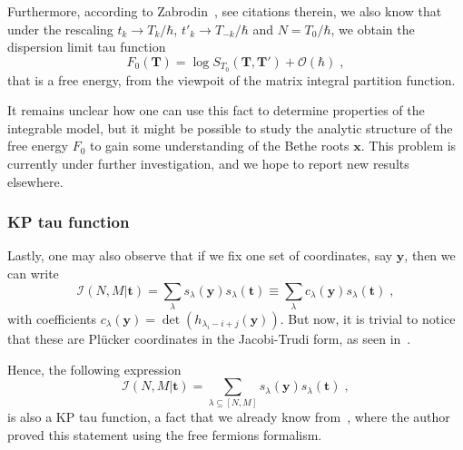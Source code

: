 \documentclass[a4paper,11pt]{amsart}
\begin{document}
Furthermore, according to Zabrodin~\cite{Zabrodin:2010ii}, see
citations therein, we also know that under the rescaling \(t_k \to
T_k/ \hbar\), \(t'_k \to T_{-k}/ \hbar\) and \(N = T_0/ \hbar\), we
obtain the dispersion limit tau function
\begin{equation}
  F_0(\bm{T}) = \log S_{T_0}(\bm{T}, \bm{T}') + \mathcal{O}(\hbar)\; ,
\end{equation}
that is a free energy, from the viewpoit of the matrix integral
partition function.

It remains unclear how one can use this fact to determine properties
of the integrable model, but it might be possible to study the
analytic structure of the free energy \(F_0\) to gain some
understanding of the Bethe roots \(\bm{x}\). This problem is currently
under further investigation, and we hope to report new results
elsewhere.


\subsubsection{KP tau function}
Lastly, one may also observe that if we fix one set of coordinates,
say \(\bm{y}\), then we can write
\begin{equation}
 \mathcal{I}(N,M|\bm{t}) 
 = \sum_{\lambda} s_\lambda(\bm{y})  s_\lambda(\bm{t}) 
 \equiv \sum_{\lambda} c_\lambda(\bm{y})  s_\lambda(\bm{t}) \; ,
\end{equation}
with coefficients \(c_\lambda(\bm{y}) = \det (h_{\lambda_i-i
  +j}(\bm{y}))\). But now, it is trivial to notice that these are
Plücker coordinates in the Jacobi-Trudi form, as seen
in~\cite{Miwa2000, Alexandrov:2012tr}.

Hence, the following expression
\begin{equation}
 \mathcal{I}(N,M|\bm{t}) = \sum_{\lambda \subseteq [N,M]} s_\lambda(\bm{y})  s_\lambda(\bm{t}) \; ,
\end{equation}
is also a KP tau function, a fact that we already know
from~\cite{Wheeler:2010vmq}, where the author proved this statement
using the free fermions formalism.

\end{document}
